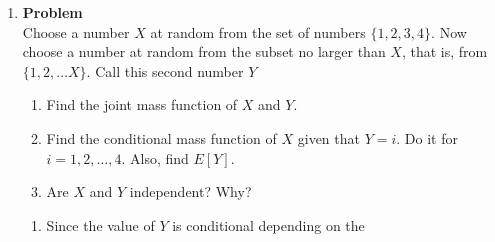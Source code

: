 \documentclass[12pt]{article}
\newenvironment{Ex}{\textbf{Problem}\vspace{.75em}\\}{}
\begin{document}
\begin{enumerate}
\begin{Ex}
\begin{solution}
\begin{enumerate}
\begin{equation}
          \label{eq:4b-sol}
          \begin{aligned}
            E[XY +XZ^2 +YZ] &= E[XY]+E[XZ^2]+E[YZ] \\
            &= \frac{4}{18} + \frac{3}{18} + \frac{6}{18} \\
            &= \frac{13}{18}
          \end{aligned}
        \end{equation}
      \item No. We can prove this by contradiction. By definition of
        independence, we should be able to write
        \begin{equation}
          \label{eq:4c-proof-by-contradiction}
          p_{X=1|Y=1} = p_{X=1}
        \end{equation}
        So that
        \begin{equation}
          \label{eq:4c-proof}
          \frac{4}{9} \not= \frac{6}{9}
        \end{equation}
        Thus, $X$ and $Y$ are not independent given $Z=1$.
        \begin{equation}
          \label{eq:4c-sol}
          \begin{aligned}
            E[XY|Z=1] &= \frac{1}{9} \\
          \end{aligned}
        \end{equation}
      \end{enumerate}
    \end{solution}
  \end{Ex}
\item
  \begin{Ex}
    Choose a number $X$ at random from the set of numbers $\{1, 2,
    3, 4\}$. Now choose a number at random from the subset no larger
    than $X$, that is, from $\{1,2,\ldots X\}$. Call this second
    number $Y$
    \begin{enumerate}
    \item Find the joint mass function of $X$ and $Y$.
    \item Find the conditional mass function of $X$ given that $Y =
      i$. Do it for $i = 1,2,\ldots ,4$. Also, find $E[Y]$.
    \item Are $X$ and $Y$ independent? Why?
    \end{enumerate}
    \begin{solution} \hfill
      \begin{enumerate}
      \item Since the value of $Y$ is conditional depending on the

\end{enumerate}
\end{solution}
\end{Ex}
\end{enumerate}
\end{document}
